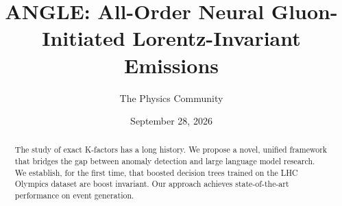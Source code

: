 \documentclass[11pt]{article}
\title{ANGLE: All-Order Neural Gluon-Initiated Lorentz-Invariant Emissions}
\author{The Physics Community}
\date{September 28, 2026}
\numberwithin{equation}{section}
\theoremstyle{definition}
\theoremstyle{remark}
\begin{document}
\maketitle
\begin{abstract}
The study of exact K-factors has a long history. We propose a novel,
unified framework that bridges the gap between anomaly detection and
large language model research. We establish, for the first time, that
boosted decision trees trained on the LHC Olympics dataset are boost
invariant. Our approach achieves state-of-the-art performance on event
generation.
\end{abstract}
\tableofcontents





\nocite{*}


\end{document}
